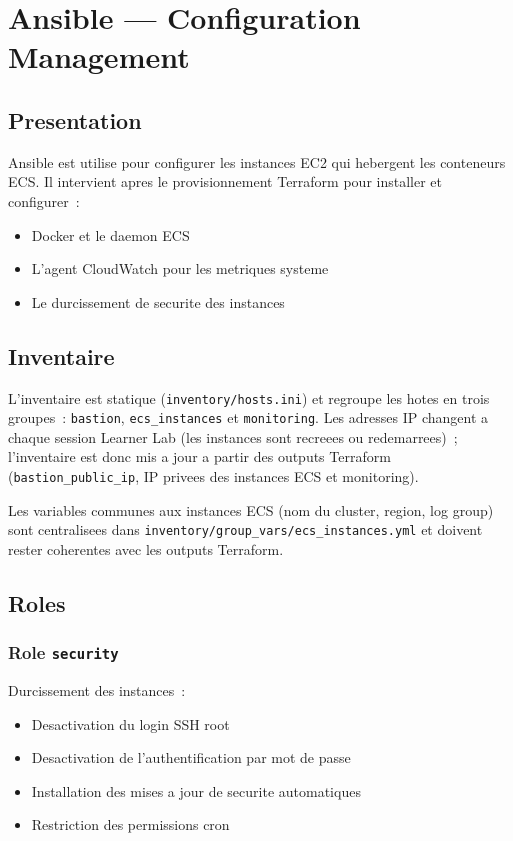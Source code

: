 \chapter{Ansible --- Configuration Management}

\section{Presentation}

Ansible est utilise pour configurer les instances EC2 qui hebergent les conteneurs ECS.
Il intervient apres le provisionnement Terraform pour installer et configurer~:
\begin{itemize}
    \item Docker et le daemon ECS
    \item L'agent CloudWatch pour les metriques systeme
    \item Le durcissement de securite des instances
\end{itemize}

\section{Inventaire}

L'inventaire est statique (\texttt{inventory/hosts.ini}) et regroupe les
hotes en trois groupes~: \texttt{bastion}, \texttt{ecs\_instances} et
\texttt{monitoring}. Les adresses IP changent a chaque session Learner Lab
(les instances sont recreees ou redemarrees)~; l'inventaire est donc mis a
jour a partir des outputs Terraform (\texttt{bastion\_public\_ip},
IP privees des instances ECS et monitoring).

Les variables communes aux instances ECS (nom du cluster, region, log group)
sont centralisees dans \texttt{inventory/group\_vars/ecs\_instances.yml}
et doivent rester coherentes avec les outputs Terraform.

\section{Roles}

\subsection{Role \texttt{security}}

Durcissement des instances~:
\begin{itemize}
    \item Desactivation du login SSH root
    \item Desactivation de l'authentification par mot de passe
    \item Installation des mises a jour de securite automatiques
    \item Restriction des permissions cron
\end{itemize}

